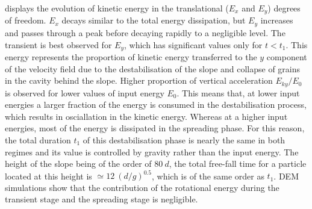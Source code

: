 \documentclass[3p,times,procedia,number]{elsarticle}
\begin{document}
 displays the evolution of kinetic energy 
in the translational ($E_x$ and $E_y$) degrees of freedom. $E_x$ decays similar 
to the total energy dissipation, but $E_y$ increases and passes through a peak 
before decaying rapidly to a negligible level. The transient is best 
observed for $E_y$, which has significant values only for $t< t_1$. This energy 
represents the proportion of kinetic energy transferred to the $y$ component of 
the velocity field  due to the destabilisation of the slope and collapse of 
grains in the cavity behind the slope. Higher proportion of vertical 
acceleration $E_{ky}/E_0$ is observed for lower values of input energy $E_0$. 
This means that, at lower input energies a larger fraction of the energy is 
consumed in the destabilisation process, which results in osciallation in the
kinetic energy. Whereas at a higher input energies, most of the energy is
dissipated in the spreading phase. For this reason, the total duration $t_1$
of this destabilisation phase is nearly the same in both regimes and its
value is controlled by gravity rather than the input energy. The height of
the slope being of the order of $80 \ d$, the total free-fall time for a
particle located at this height is $\simeq 12 \ (d/g)^{0.5}$, which is of the
same order as $t_1$. DEM simulations show that the contribution of the
rotational energy during the transient stage and the spreading stage is
negligible. 
\end{document}
